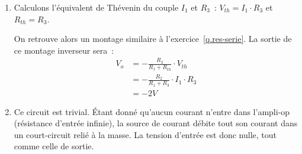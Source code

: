 \documentclass{../template/tp}
\begin{document}
{
	\begin{enumerate}
		\item Calculons l'équivalent de Thévenin du couple $I_1$ et $R_3$~: $V_{th} = I_1 \cdot R_3$ et $R_{th} = R_3$.

		On retrouve alors un montage similaire à l'exercice~\ref{q.res-serie}.
		La sortie de ce montage inverseur sera~:
		\begin{align*}
		V_o & = - \frac{R_2}{R_1 + R_{th}} \cdot V_{th} \\
		& = - \frac{R_2}{R_1 + R_3} \cdot I_1 \cdot R_3 \\
		& = -2 V
		\end{align*}

		\item Ce circuit est trivial. Étant donné qu'aucun courant n'entre dans l'ampli-op (résistance d'entrée infinie), la source de courant débite tout son courant dans un court-circuit relié à la masse.
		La tension d'entrée est donc nulle, tout comme celle de sortie.
	\end{enumerate}
}
\end{document}
